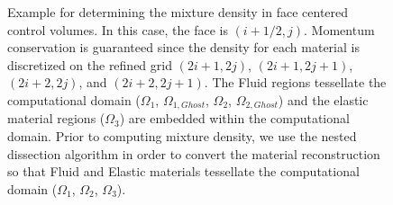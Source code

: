 \documentclass[]{article}
\begin{document}
\begin{figure}

\caption{Example for determining the mixture density in face centered
 control volumes.  In this case, the face is $(i+1/2,j)$.  Momentum
 conservation is guaranteed since the density for each material is
 discretized on the refined grid $(2i+1,2j)$, $(2i+1,2j+1)$,
 $(2i+2,2j)$, and $(2i+2,2j+1)$.  The Fluid regions tessellate the
 computational domain ($\Omega_{1}$, $\Omega_{1,Ghost}$, 
 $\Omega_{2}$, $\Omega_{2,Ghost}$) and the elastic material regions
 ($\Omega_{3}$) are 
 embedded within the computational domain.  Prior to computing
 mixture density, we use the nested dissection algorithm in order
 to convert the material reconstruction so that Fluid and 
 Elastic materials tessellate the computational domain
 ($\Omega_{1}$, $\Omega_{2}$, $\Omega_{3}$).
 \label{MAC_density_fig}}
\end{figure}
\end{document}
